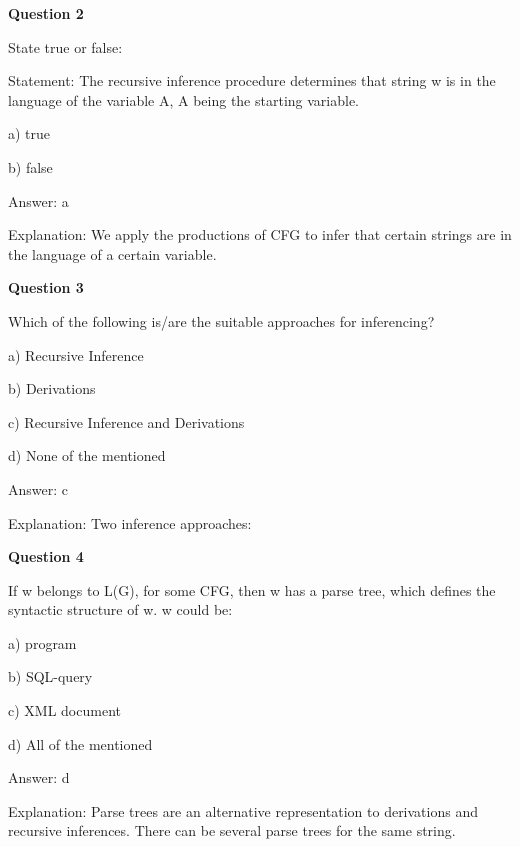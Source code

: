 \documentclass{article}
\begin{document}
\begin{mdframed}[linewidth=1pt, roundcorner=5pt, linecolor=gray!30, backgroundcolor=gray!5]
\textbf{Question 2} 

State true or false:

Statement: The recursive inference procedure determines that string w is in the language of the variable A, A being the starting variable.

a) true

b) false
\vspace{5pt} \par
\begin{tcolorbox}[colback=green!5, colframe=green!40!black, title=Solution]
Answer: a

Explanation: We apply the productions of CFG to infer that certain strings are in the language of a certain variable.
\end{tcolorbox}
\end{mdframed}

\begin{mdframed}[linewidth=1pt, roundcorner=5pt, linecolor=gray!30, backgroundcolor=gray!5]
\textbf{Question 3} 

Which of the following is/are the suitable approaches for inferencing?

a) Recursive Inference

b) Derivations

c) Recursive Inference and Derivations

d) None of the mentioned
\vspace{5pt} \par
\begin{tcolorbox}[colback=green!5, colframe=green!40!black, title=Solution]
Answer: c

Explanation: Two inference approaches:
\end{tcolorbox}
\end{mdframed}
\newpage

\begin{mdframed}[linewidth=1pt, roundcorner=5pt, linecolor=gray!30, backgroundcolor=gray!5]
\textbf{Question 4} 

If w belongs to L(G), for some CFG, then w has a parse tree, which defines the syntactic structure of w. w could be:

a) program

b) SQL-query

c) XML document

d) All of the mentioned
\vspace{5pt} \par
\begin{tcolorbox}[colback=green!5, colframe=green!40!black, title=Solution]
Answer: d

Explanation: Parse trees are an alternative representation to derivations and recursive inferences. There can be several parse trees for the same string.
\end{tcolorbox}
\end{mdframed}
\end{document}
